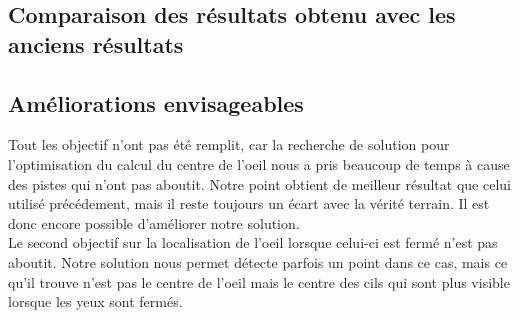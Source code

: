\subsection{Comparaison des résultats obtenu avec les anciens résultats}

\subsection{Améliorations envisageables}
Tout les objectif n'ont pas été remplit, car la recherche de solution pour l'optimisation du calcul du centre de l'oeil
nous a pris beaucoup de temps à cause des pistes qui n'ont pas aboutit. Notre point obtient de meilleur résultat
que celui utilisé précédement, mais il reste toujours un écart avec la vérité terrain. Il est donc encore possible
d'améliorer notre solution.\\

Le second objectif sur la localisation de l'oeil lorsque celui-ci est fermé n'est pas aboutit. Notre solution
nous permet détecte parfois un point dans ce cas, mais ce qu'il trouve n'est pas le centre de l'oeil mais le
centre des cils qui sont plus visible lorsque les yeux sont fermés.